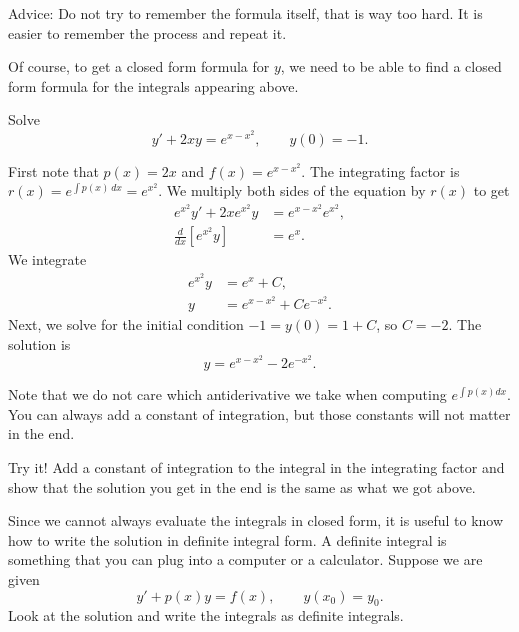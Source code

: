 \documentclass{ximera}
\begin{document}
Advice: Do not try to remember the formula itself, that is way too hard.  It is easier to remember the process and repeat it.

Of course, to get a closed form formula for $y$, we need to be able to find a closed form formula for the integrals appearing above.

\begin{example}
    Solve
    \begin{equation*}
        y' + 2xy = e^{x-x^2}, \qquad y(0) = -1 .
    \end{equation*}
\end{example}

\begin{exampleSol}
    First note that $p(x) = 2x$ and $f(x) = e^{x-x^2}$. The integrating factor is $r(x) = e^{\int p(x)\, dx} = e^{x^2}$. We multiply both sides of the equation by $r(x)$ to get
    \begin{align*}
        e^{x^2} y' + 2xe^{x^2}y & = e^{x-x^2} e^{x^2} , \\
        \frac{d}{dx} \left[ e^{x^2} y \right] &= e^x .
    \end{align*}
    We integrate
    \begin{align*}
        e^{x^2} y &= e^x +C , \\
        y &= e^{x-x^2} + C e^{-x^2} .
    \end{align*}
    Next, we solve for the initial condition $-1 = y(0) = 1 + C$, so $C=-2$. The solution is
    \begin{equation*}
        y = e^{x-x^2} - 2 e^{-x^2} .
    \end{equation*}
\end{exampleSol}

Note that we do not care which antiderivative we take when computing $e^{\int p(x) dx}$.  You can always add a constant of integration, but those constants will not matter in the end.

\begin{exercise}
    Try it!  Add a constant of integration to the integral in the integrating factor and show that the solution you get in the end is the same as what we got above.
\end{exercise}

Since we cannot always evaluate the integrals in closed form, it is useful to know how to write the solution in definite integral form.  A definite integral is something that you can plug into a computer or a calculator.  Suppose we are given
\begin{equation*}
    y' + p(x) y = f(x) , \qquad y(x_0) = y_0 .
\end{equation*}
Look at the solution and write the integrals as definite integrals.
\end{document}
